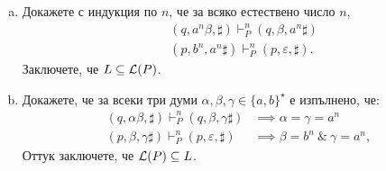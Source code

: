 \begin{extra}
\begin{example}
  \begin{enumerate}[a)]
  \item
    Докажете с индукция по $n$, че за всяко естествено число $n$,
    \begin{align*}
      & (q, a^n\beta, \sharp) \vdash^n_P (q, \beta, a^n\sharp)\\
      & (p, b^n, a^n\sharp) \vdash^n_P (p, \varepsilon,\sharp).
    \end{align*}
    Заключете, че $L \subseteq \mathcal{L}(P)$.
  \item
    Докажете, че за всеки три думи $\alpha,\beta, \gamma \in \{a,b\}^\star$ е изпълнено, че:
    \begin{align*}
      (q, \alpha\beta, \sharp) \vdash^n_P (q, \beta, \gamma\sharp)  & \implies \alpha = \gamma = a^n\\
      (p, \beta, \gamma\sharp) \vdash^n_P (p, \varepsilon, \sharp) & \implies \beta = b^n\ \&\ \gamma = a^n,
    \end{align*}
    Оттук заключете, че $\mathcal{L}(P) \subseteq L$.    
  \end{enumerate}
\end{example}


\end{extra}

